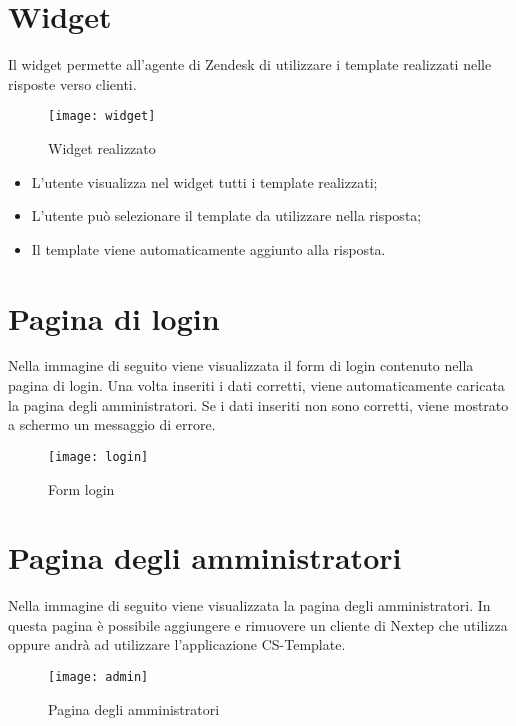 \section{Widget} 
Il widget permette all'agente di Zendesk di utilizzare i template realizzati nelle risposte verso clienti. 
  \begin{figure}[!h] 
  	\centering 
  	\texttt{[image: widget]} 
  	\caption{Widget realizzato }
  \end{figure}
  \begin{itemize}
  	\item L'utente visualizza nel widget tutti i template realizzati;
  	\item L'utente può selezionare il template da utilizzare nella risposta;
  	\item Il template viene automaticamente aggiunto alla risposta. 
  \end{itemize}
\newpage
\section{Pagina di login}
Nella immagine di seguito viene visualizzata il form di login contenuto nella pagina di login. Una volta inseriti i dati corretti, viene automaticamente caricata la pagina degli amministratori. Se i dati inseriti non sono corretti, viene mostrato a schermo un messaggio di errore.
\begin{figure}[!h] 
	\centering 
	\texttt{[image: login]} 
	\caption{Form login }
\end{figure}
\section{Pagina degli amministratori}
Nella immagine di seguito viene visualizzata la pagina degli amministratori. In questa pagina è possibile aggiungere e rimuovere un cliente di Nextep che utilizza oppure andrà ad utilizzare l'applicazione CS-Template.
\begin{figure}[!h] 
	\centering 
	\texttt{[image: admin]} 
	\caption{Pagina degli amministratori }
\end{figure}

